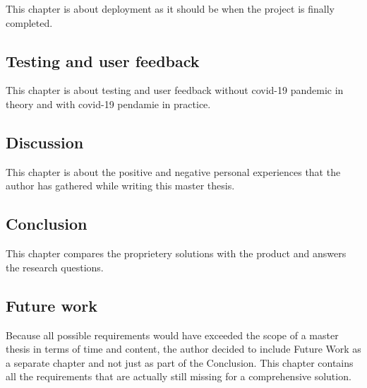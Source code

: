 This chapter is about deployment as it should be when the project is finally completed.

\subsection{Testing and user feedback}

This chapter is about testing and user feedback without covid-19 pandemic in theory and with covid-19 pendamie in practice.

\subsection{Discussion}

This chapter is about the positive and negative personal experiences that the author has gathered while writing this master thesis.

\subsection{Conclusion}

This chapter compares the proprietery solutions with the product and answers the research questions.

\subsection{Future work}

Because all possible requirements would have exceeded the scope of a master thesis in terms of time and content, the author decided to include Future Work as a separate chapter and not just as part of the Conclusion. This chapter contains all the requirements that are actually still missing for a comprehensive solution.